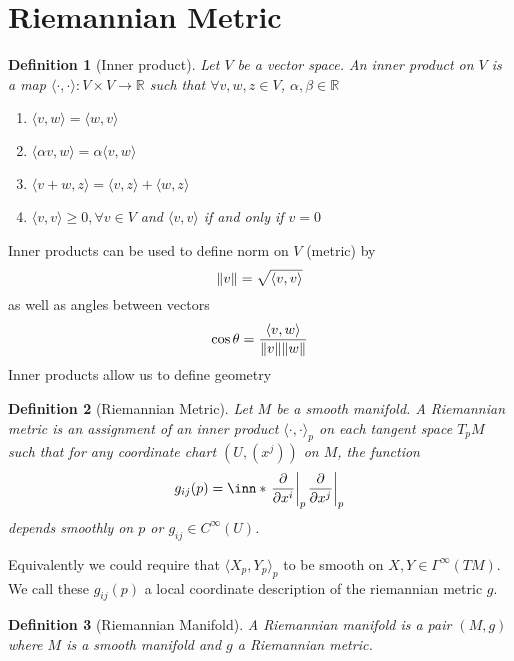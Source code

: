 \documentclass[a4paper]{article}
\newtheorem*{defn}{Definition}
\begin{document}
\section*{Riemannian Metric}%

\begin{defn}[Inner product]
  Let $V$ be a vector space. An inner product on $V$ is a map $\langle \cdot, \cdot \rangle: V \times V \rightarrow \mathds{R}$ such that $\forall v,w,z \in V$, $\alpha, \beta \in \mathds{R}$
  \begin{enumerate}
    \item  $\langle v, w \rangle = \langle w,v \rangle$
    \item $\langle \alpha v, w \rangle = \alpha \langle v,w \rangle$
    \item $\langle v + w, z \rangle = \langle v,z \rangle + \langle w, z\rangle$
    \item $\langle v, v \rangle \geq 0, \forall v \in V$ and $\langle v,v \rangle$ if and only if $v = 0$
  \end{enumerate}
\end{defn}

Inner products can be used to define norm on $V$ (metric) by 
\[
  \norm{v} = \sqrt{\langle v, v \rangle}
\]
as well as angles between vectors
\[
  \cos{\theta} = \frac{\langle v, w \rangle}{\norm{v} \norm{w}}
\]
Inner products allow us to define geometry

\begin{defn}[Riemannian Metric]
  Let $M$ be a smooth manifold. A Riemannian metric is an assignment of an inner product $\langle \cdot, \cdot \rangle_p$ on each tangent space $T_pM$ such that for any coordinate chart $(U,(x^j))$ on $M$, the function 
  \[
    g_{ij}(p) = \inn*{\eval{\pdv{}{x^i}}_p}{\eval{\pdv{}{x^j}}_p}
\]
depends smoothly on $p$ or $g_{ij} \in C^{\infty}(U)$.
\end{defn}
Equivalently we could require that $\langle X_p, Y_p \rangle_p$ to be smooth on $X,Y \in \Gamma^{\infty}(TM)$.
We call these $g_{ij}(p)$ a local coordinate description of the riemannian metric $g$.

\begin{defn}[Riemannian Manifold]
  A Riemannian manifold is a pair $(M,g)$ where $M$ is a smooth manifold and $g$ a Riemannian metric.
\end{defn}
\end{document}
